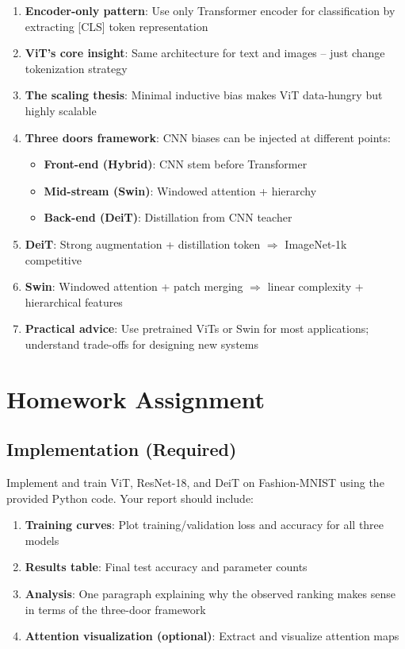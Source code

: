 \documentclass{article}
\begin{document}
\begin{enumerate}
\item \textbf{Encoder-only pattern}: Use only Transformer encoder for classification by extracting [CLS] token representation

\item \textbf{ViT's core insight}: Same architecture for text and images -- just change tokenization strategy

\item \textbf{The scaling thesis}: Minimal inductive bias makes ViT data-hungry but highly scalable

\item \textbf{Three doors framework}: CNN biases can be injected at different points:
\begin{itemize}
    \item \textbf{Front-end (Hybrid)}: CNN stem before Transformer
    \item \textbf{Mid-stream (Swin)}: Windowed attention + hierarchy
    \item \textbf{Back-end (DeiT)}: Distillation from CNN teacher
\end{itemize}

\item \textbf{DeiT}: Strong augmentation + distillation token $\Rightarrow$ ImageNet-1k competitive

\item \textbf{Swin}: Windowed attention + patch merging $\Rightarrow$ linear complexity + hierarchical features

\item \textbf{Practical advice}: Use pretrained ViTs or Swin for most applications; understand trade-offs for designing new systems
\end{enumerate}

\section{Homework Assignment}

\subsection{Implementation (Required)}

Implement and train ViT, ResNet-18, and DeiT on Fashion-MNIST using the provided Python code. Your report should include:

\begin{enumerate}
\item \textbf{Training curves}: Plot training/validation loss and accuracy for all three models

\item \textbf{Results table}: Final test accuracy and parameter counts

\item \textbf{Analysis}: One paragraph explaining why the observed ranking makes sense in terms of the three-door framework

\item \textbf{Attention visualization (optional)}: Extract and visualize attention maps
\end{enumerate}
\end{document}
